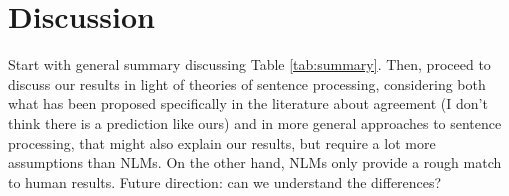 \section{Discussion}
\label{sec:discussion}



Start with general summary discussing Table \ref{tab:summary}.  Then,
proceed to discuss our results in light of theories of sentence
processing, considering both what has been proposed specifically in
the literature about agreement (I don't think there is a prediction
like ours) and in more general approaches to sentence processing, that
might also explain our results, but require a lot more assumptions
than NLMs. On the other hand, NLMs only provide a
rough match to human results. Future direction: can we understand
the differences?
